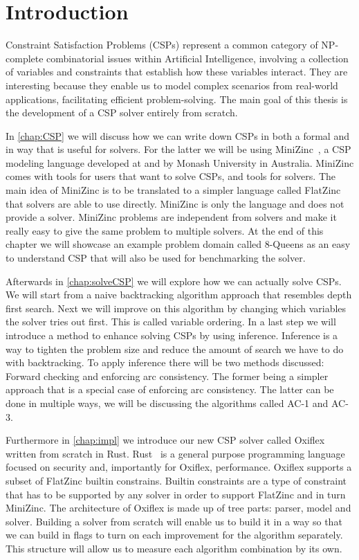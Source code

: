 
\chapter{Introduction}

Constraint Satisfaction Problems (CSPs) represent a common category of NP-complete combinatorial issues within Artificial Intelligence, involving a collection of variables and constraints that establish how these variables interact. They are interesting because they enable us to model complex scenarios from real-world applications, facilitating efficient problem-solving. The main goal of this thesis is the development of a CSP solver entirely from scratch.

In \cref{chap:CSP} we will discuss how we can write down CSPs in both a formal and in way that is useful for solvers. For the latter we will be using MiniZinc~\cite{minizinc:2007}, a CSP modeling language developed at and by Monash University in Australia. MiniZinc comes with tools for users that want to solve CSPs, and tools for solvers. The main idea of MiniZinc is to be translated to a simpler language called FlatZinc that solvers are able to use directly. MiniZinc is only the language and does not provide a solver. MiniZinc problems are independent from solvers and make it really easy to give the same problem to multiple solvers. At the end of this chapter we will showcase an example problem domain called 8-Queens as an easy to understand CSP that will also be used for benchmarking the solver.

Afterwards in \cref{chap:solveCSP} we will explore how we can actually solve CSPs. We will start from a naive backtracking algorithm approach that resembles depth first search. Next we will improve on this algorithm by changing which variables the solver tries out first. This is called variable ordering. In a last step we will introduce a method to enhance solving CSPs by using inference. Inference is a way to tighten the problem size and reduce the amount of search we have to do with backtracking. To apply inference there will be two methods discussed: Forward checking and enforcing arc consistency. The former being a simpler approach that is a special case of enforcing arc consistency. The latter can be done in multiple ways, we will be discussing the algorithms called AC-1 and AC-3.

Furthermore in \cref{chap:impl} we introduce our new CSP solver called Oxiflex written from scratch in Rust. Rust~\cite{rust:2014} is a general purpose programming language focused on security and, importantly for Oxiflex, performance. Oxiflex supports a subset of FlatZinc builtin constrains. Builtin constraints are a type of constraint that has to be supported by any solver in order to support FlatZinc and in turn MiniZinc. The architecture of Oxiflex is made up of tree parts: parser, model and solver. Building a solver from scratch will enable us to build it in a way so that we can build in flags to turn on each improvement for the algorithm separately. This structure will allow us to measure each algorithm combination by its own.


